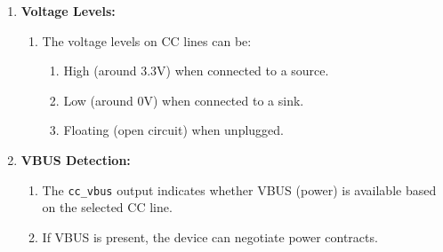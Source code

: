 \begin{enumerate}
    \item \textbf{Voltage Levels:}
    \begin{enumerate}
        \item The voltage levels on CC lines can be:
        \begin{enumerate}
            \item High (around 3.3V) when connected to a source.
            \item Low (around 0V) when connected to a sink.
            \item Floating (open circuit) when unplugged.
        \end{enumerate}
    \end{enumerate}

    \item \textbf{VBUS Detection:}
    \begin{enumerate}
        \item The \texttt{cc\_vbus} output indicates whether VBUS (power) is available based on the selected CC line.
        \item If VBUS is present, the device can negotiate power contracts.
    \end{enumerate}
\end{enumerate}


